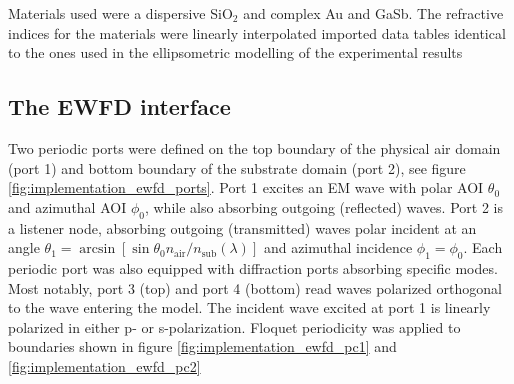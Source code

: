 Materials used were a dispersive SiO$_2$ and complex Au and GaSb. The refractive indices for the materials were linearly interpolated imported data tables identical to the ones used in the ellipsometric modelling of the experimental results  

\subsection{The EWFD interface}
Two periodic ports were defined on the top boundary of the physical air domain (port 1) and bottom boundary of the substrate domain (port 2), see figure \ref{fig:implementation_ewfd_ports}. Port 1 excites an EM wave with polar AOI $\theta_0$ and azimuthal AOI $\phi_0$, while also absorbing outgoing (reflected) waves. Port 2 is a listener node, absorbing outgoing (transmitted) waves polar incident at an angle $\theta_1 = \arcsin[\sin\theta_0 n_{\text{air}}/n_{\text{sub}}(\lambda)]$ and azimuthal incidence $\phi_1=\phi_0$. Each periodic port was  also equipped with diffraction ports absorbing specific modes. Most notably, port 3 (top) and port 4 (bottom) read waves polarized orthogonal to the wave entering the model. The incident wave excited at port 1 is linearly polarized in either p- or s-polarization. Floquet periodicity was applied to boundaries shown in figure \ref{fig:implementation_ewfd_pc1} and \ref{fig:implementation_ewfd_pc2}

